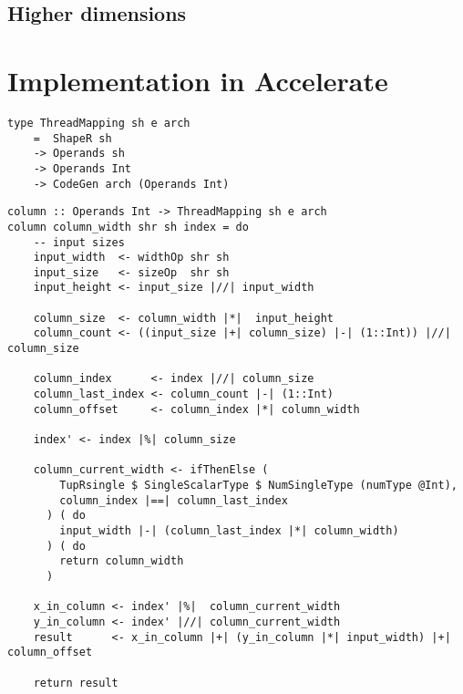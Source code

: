 \subsection{Higher dimensions}

\section{Implementation in Accelerate}




\begin{listing}[!ht]
    \begin{verbatim}    
type ThreadMapping sh e arch 
    =  ShapeR sh 
    -> Operands sh 
    -> Operands Int 
    -> CodeGen arch (Operands Int)
    \end{verbatim}
    \label{lst:threadmapping_type}
\end{listing}

\begin{listing}
    \begin{verbatim}
column :: Operands Int -> ThreadMapping sh e arch
column column_width shr sh index = do
    -- input sizes
    input_width  <- widthOp shr sh
    input_size   <- sizeOp  shr sh
    input_height <- input_size |//| input_width
    
    column_size  <- column_width |*|  input_height
    column_count <- ((input_size |+| column_size) |-| (1::Int)) |//| column_size

    column_index      <- index |//| column_size
    column_last_index <- column_count |-| (1::Int)
    column_offset     <- column_index |*| column_width

    index' <- index |%| column_size

    column_current_width <- ifThenElse (
        TupRsingle $ SingleScalarType $ NumSingleType (numType @Int), 
        column_index |==| column_last_index
      ) ( do
        input_width |-| (column_last_index |*| column_width)
      ) ( do
        return column_width
      )
    
    x_in_column <- index' |%|  column_current_width
    y_in_column <- index' |//| column_current_width
    result      <- x_in_column |+| (y_in_column |*| input_width) |+| column_offset

    return result
    \end{verbatim}
    \caption{
    }
    \label{lst:column_mapping}
\end{listing}

